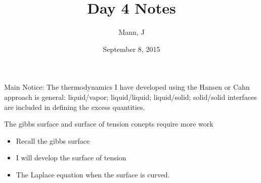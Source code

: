 \documentclass{article}
\author{Mann, J}
\title{Day 4 Notes}
\date{September 8, 2015}
\begin{document}
\maketitle{}
\renewcommand{\d}[0]{\mathrm{d}}
\newcommand{\dOne}[2]{\frac{\partial #1}{\partial #2}}
\newcommand{\dtwo}[2]{\frac{\partial^2 #1}{\partial #2^2}}
\newcommand{\diag}[1]{\bcancel{#1}}
\newcommand{\matr}[1]{\bm{#1}}
\begin{section}{Main}
  Notice: The thermodynamics I have developed using the Hansen or Cahn approach is general: liquid/vapor; liquid/liquid; liquid/solid; solid/solid interfaces are included in defining the excess quantities.

  The gibbs surface and surface of tension conepts require more work
  \begin{itemize}
    \item Recall the gibbs surface
    \item I will develop the surface of tension
    \item The Laplace equation when the surface is curved.
  \end{itemize}
\end{section}
\end{document}
